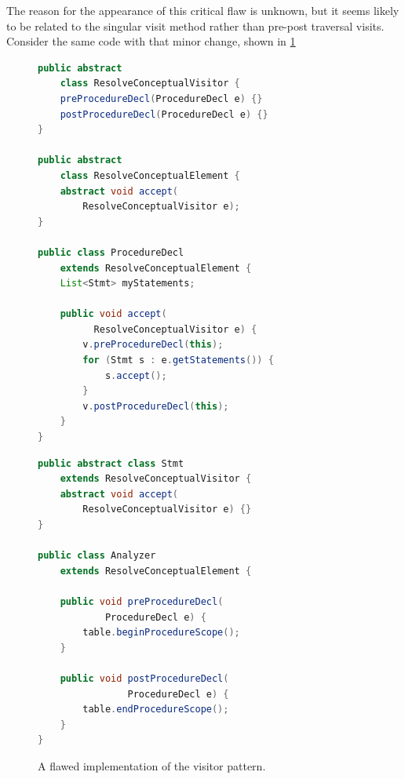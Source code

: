 \documentclass[times]{speauth}
\begin{document}
The reason for the appearance of this critical flaw is unknown, but it seems likely to be related to the singular visit method rather than pre-post traversal visits. Consider the same code with that minor change, shown in \ref{fig:fixedvisitorexample}

\begin{figure}[!htb]
\centering
\begin{minipage}{.45\textwidth}
\begin{lstlisting}[language=java]
public abstract
	class ResolveConceptualVisitor {
    preProcedureDecl(ProcedureDecl e) {}
    postProcedureDecl(ProcedureDecl e) {}
}

public abstract 
	class ResolveConceptualElement {
    abstract void accept(
        ResolveConceptualVisitor e);
}

public class ProcedureDecl
	extends ResolveConceptualElement {	
    List<Stmt> myStatements;
    
    public void accept(
    	  ResolveConceptualVisitor e) {
        v.preProcedureDecl(this);
        for (Stmt s : e.getStatements()) {
            s.accept();
        }
        v.postProcedureDecl(this);
    }
}
\end{lstlisting}
\end{minipage}\quad
\begin{minipage}{.45\textwidth}
\begin{lstlisting}[language=java]
public abstract class Stmt
	extends ResolveConceptualVisitor {
    abstract void accept(
    	ResolveConceptualVisitor e) {}
}

public class Analyzer
	extends ResolveConceptualElement {
	
    public void preProcedureDecl(
  			ProcedureDecl e) {
        table.beginProcedureScope();
    }
    
    public void postProcedureDecl(
    			ProcedureDecl e) {
        table.endProcedureScope();
    }        
}
\end{lstlisting}
\end{minipage}
\caption{A flawed implementation of the visitor pattern.}
\label{fig:fixedvisitorexample}
\end{figure}
\end{document}
